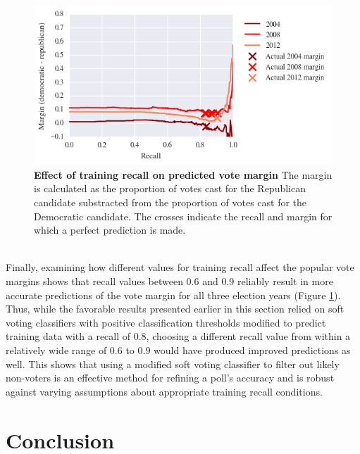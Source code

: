 \documentclass{article}
\begin{document}
	\begin{figure}[h!]
		\begin{center}
			\includegraphics*[width=0.8\linewidth]{recall_margin}
			\caption{\textbf{Effect of training recall on predicted vote margin} The margin is calculated as the proportion of votes cast for the Republican candidate substracted from the proportion of votes cast for the Democratic candidate. The crosses indicate the recall and margin for which a perfect prediction is made.}
			\label{fig:recall_margin}
		\end{center}
	\end{figure}
	\hfill \\
	Finally, examining how different values for training recall affect the popular vote margins shows that  recall values between 0.6 and 0.9 reliably result in more accurate predictions of the vote margin for all three election years (Figure \ref{fig:recall_margin}). Thus, while the favorable results presented earlier in this section relied on soft voting classifiers with positive classification thresholds modified to predict training data with a recall of 0.8, choosing a different recall value from within a relatively wide range of 0.6 to 0.9 would have produced improved predictions as well. This shows that using a modified soft voting classifier to filter out likely non-voters is an effective method for refining a poll's accuracy and is robust against varying assumptions about appropriate training recall conditions.
	
	\section{Conclusion}
	
\end{document}
